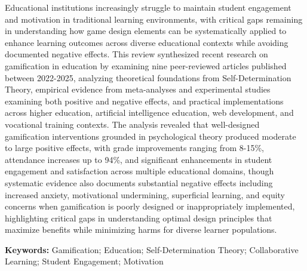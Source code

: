 \documentclass[12pt,a4paper]{article}
\begin{document}
\begin{justify}

Educational institutions increasingly struggle to maintain student engagement and motivation in traditional learning environments, with critical gaps remaining in understanding how game design elements can be systematically applied to enhance learning outcomes across diverse educational contexts while avoiding documented negative effects. This review synthesized recent research on gamification in education by examining nine peer-reviewed articles published between 2022-2025, analyzing theoretical foundations from Self-Determination Theory, empirical evidence from meta-analyses and experimental studies examining both positive and negative effects, and practical implementations across higher education, artificial intelligence education, web development, and vocational training contexts. The analysis revealed that well-designed gamification interventions grounded in psychological theory produced moderate to large positive effects, with grade improvements ranging from 8-15\%, attendance increases up to 94\%, and significant enhancements in student engagement and satisfaction across multiple educational domains, though systematic evidence also documents substantial negative effects including increased anxiety, motivational undermining, superficial learning, and equity concerns when gamification is poorly designed or inappropriately implemented, highlighting critical gaps in understanding optimal design principles that maximize benefits while minimizing harms for diverse learner populations.

\vspace{0.3cm}

\textbf{Keywords:} Gamification; Education; Self-Determination Theory; Collaborative Learning; Student Engagement; Motivation

\end{justify}





\newpage

\tableofcontents

\newpage



\end{document}
